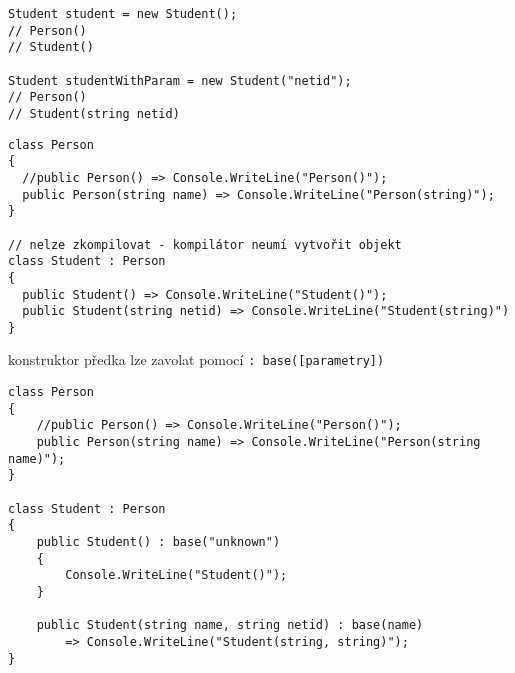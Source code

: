 \begin{frame}[fragile]
\begin{yesblock}
\begin{lstlisting}[basicstyle=\small]
Student student = new Student();
// Person()
// Student()

Student studentWithParam = new Student("netid");
// Person()
// Student(string netid)
\end{lstlisting}
\end{yesblock}
\end{frame}


\begin{frame}[fragile]
\begin{noblock}
\begin{lstlisting}[basicstyle=\small]
class Person
{
  //public Person() => Console.WriteLine("Person()");
  public Person(string name) => Console.WriteLine("Person(string)");
}

// nelze zkompilovat - kompilátor neumí vytvořit objekt
class Student : Person
{
  public Student() => Console.WriteLine("Student()");
  public Student(string netid) => Console.WriteLine("Student(string)")
}
\end{lstlisting}
\end{noblock}
\end{frame}



\begin{frame}[fragile]
\begin{bitemize}{}
\item konstruktor předka lze zavolat pomocí \lstinline|: base([parametry])|
\end{bitemize}
\vfill
\begin{yesblock}
\begin{lstlisting}[basicstyle=\small]
class Person
{
    //public Person() => Console.WriteLine("Person()");
    public Person(string name) => Console.WriteLine("Person(string name)");
}

class Student : Person
{
    public Student() : base("unknown") 
    {
        Console.WriteLine("Student()");
    }

    public Student(string name, string netid) : base(name) 
        => Console.WriteLine("Student(string, string)");
}
\end{lstlisting}
\end{yesblock}
\end{frame}




